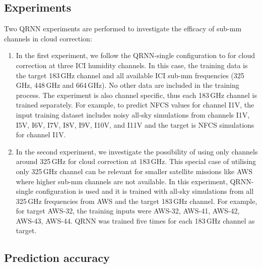 \documentclass[amt, manuscript]{copernicus}
\begin{document}
\subsection{Experiments}
%
Two QRNN experiments are performed to investigate the efficacy of sub-mm channels in cloud correction: 
\begin{enumerate}
	\item In the first experiment, we follow the QRNN-single configuration to for cloud correction at three ICI humidity channels. In this case, the training data is the target 183\,GHz channel and all available ICI sub-mm frequencies (325\,GHz, 448\,GHz and 664\,GHz). No other data are included in the training process. The experiment is also channel specific, thus each 183\,GHz channel is trained separately. For example, to predict NFCS values for channel I1V, the input training dataset includes noisy all-sky simulations from channels I1V, I5V, I6V, I7V, I8V, I9V, I10V, and I11V and the target is NFCS simulations for channel I1V.
	
	\item In the second experiment, we investigate the possibility of using only channels around 325\,GHz for cloud correction at 183\,GHz. This special case of utilising only 325\,GHz channel can be relevant for smaller satellite missions like AWS where higher sub-mm channels are not available. In this experiment, QRNN-single configuration is used and it is trained with all-sky simulations from all 325\,GHz frequencies from AWS and the target 183\,GHz channel. For example, for target AWS-32, the training inputs were AWS-32, AWS-41, AWS-42, AWS-43, AWS-44. QRNN was trained five times for each 183\,GHz channel as target. 
	
\end{enumerate}	

\subsection{Prediction accuracy}
\end{document}
